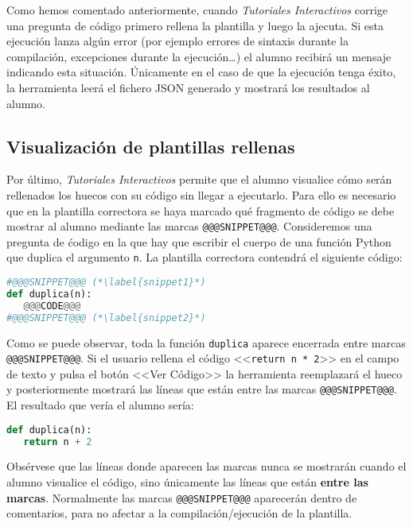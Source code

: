 \documentclass[]{article}
\newcommand{\code}[1]{{\lstinline[basicstyle=\ttfamily,mathescape]!#1!}}
\newcommand{\toolname}{\emph{Tutoriales Interactivos}}
\begin{document}
Como hemos comentado anteriormente, cuando \toolname{} corrige una pregunta de código primero rellena la plantilla y luego la ajecuta. Si esta ejecución lanza algún error (por ejemplo errores de sintaxis durante la compilación, excepciones durante la ejecución\ldots) el alumno recibirá un mensaje indicando esta situación. Únicamente en el caso de que la ejecución tenga éxito, la herramienta leerá el fichero JSON generado y mostrará los resultados al alumno.

\subsection{Visualización de plantillas rellenas}
Por último, \toolname{} permite que el alumno visualice cómo serán rellenados los huecos con su código sin llegar a ejecutarlo. Para ello es necesario que en la plantilla correctora se haya marcado qué fragmento de código se debe mostrar al alumno mediante las marcas \code{@@@SNIPPET@@@}. Consideremos una pregunta de ćodigo en la que hay que escribir el cuerpo de una función Python que duplica el argumento \code{n}. La plantilla correctora contendrá el siguiente código:
\begin{lstlisting}[language=Python,basicstyle=\ttfamily, otherkeywords={with}]
#@@@SNIPPET@@@ (*\label{snippet1}*)
def duplica(n):
   @@@CODE@@@
#@@@SNIPPET@@@ (*\label{snippet2}*)
\end{lstlisting}
Como se puede observar, toda la función \code{duplica} aparece encerrada entre marcas \code{@@@SNIPPET@@@}. Si el usuario rellena el código <<\code{return n * 2}>> en el campo de texto y pulsa el botón <<Ver Código>> la herramienta reemplazará el hueco y posteriormente mostrará las líneas que están entre las marcas \code{@@@SNIPPET@@@}. El resultado que vería el alumno sería:
\begin{lstlisting}[language=Python,basicstyle=\ttfamily, otherkeywords={with}]
def duplica(n):
   return n + 2
\end{lstlisting}
Obsérvese que las líneas donde aparecen las marcas nunca se mostrarán cuando el alumno visualice el código, sino únicamente las líneas que están \textbf{entre las marcas}. Normalmente las marcas \code{@@@SNIPPET@@@} aparecerán dentro de comentarios, para no afectar a la compilación/ejecución de la plantilla.
\end{document}
